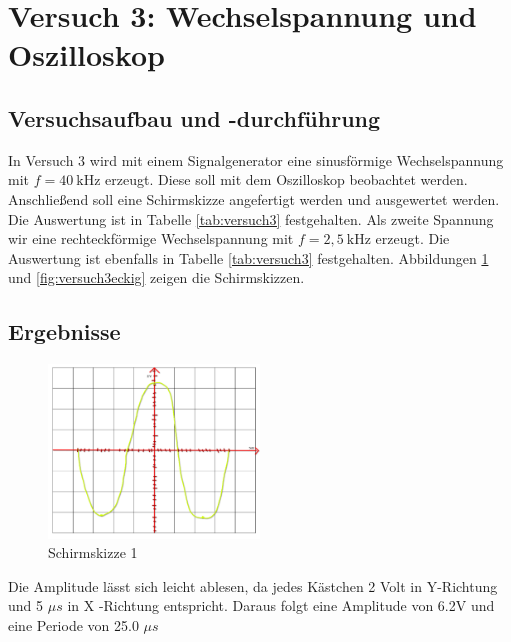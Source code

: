\section{Versuch 3: Wechselspannung und Oszilloskop}

    \subsection{Versuchsaufbau und -durchführung}
        
        In Versuch 3 wird mit einem Signalgenerator eine sinusförmige Wechselspannung mit $f = 40\ \mathrm{kHz}$ erzeugt. Diese soll mit dem Oszilloskop beobachtet werden. Anschließend soll eine Schirmskizze angefertigt werden und ausgewertet werden. Die Auswertung ist in Tabelle \ref{tab:versuch3} festgehalten. Als zweite Spannung wir eine rechteckförmige Wechselspannung mit $f = 2,5\ \mathrm{kHz}$ erzeugt. Die Auswertung ist ebenfalls in Tabelle \ref{tab:versuch3} festgehalten.
        Abbildungen \ref{fig:versuch3sinus} und \ref{fig:versuch3eckig} zeigen die Schirmskizzen.

    \subsection{Ergebnisse}

        \begin{figure}[H]
            \centering
            \includegraphics[width=0.5\textwidth]{bilder/Schirmskizze1_1.png}
            \caption{Schirmskizze 1}
       	    \label{fig:versuch3sinus}
        \end{figure}
    
		Die Amplitude lässt sich leicht ablesen, da jedes Kästchen 2 Volt in Y-Richtung und 5 $\mu s$ in X -Richtung entspricht. Daraus folgt eine Amplitude von 6.2V und eine Periode von 25.0 $\mu s$

